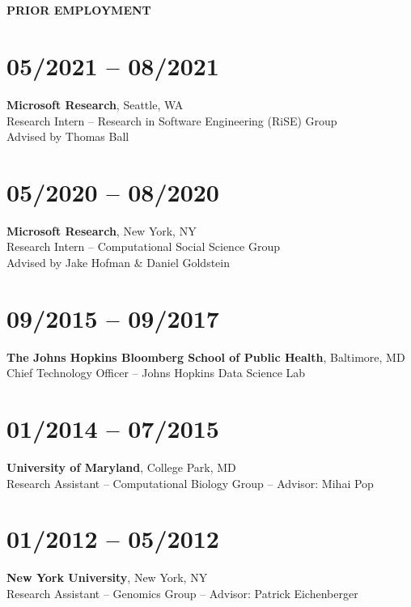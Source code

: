 \section{} \vspace{0.1in} \textbf{PRIOR EMPLOYMENT} \vspace{-0.5em}

\section{05/2021 -- 08/2021}
\textbf{Microsoft Research}, Seattle, WA \\
Research Intern -- Research in Software Engineering (RiSE) Group \\
Advised by Thomas Ball

\section{05/2020 -- 08/2020}
\textbf{Microsoft Research}, New York, NY \\
Research Intern -- Computational Social Science Group \\
Advised by Jake Hofman \& Daniel Goldstein

\section{09/2015 -- 09/2017}
\textbf{The Johns Hopkins Bloomberg School of Public Health}, Baltimore, MD \\
Chief Technology Officer -- Johns Hopkins Data Science Lab

\section{01/2014 -- 07/2015}
\textbf{University of Maryland}, College Park, MD \\
Research Assistant --  Computational Biology Group -- Advisor: Mihai Pop

\section{01/2012 -- 05/2012}
\textbf{New York University}, New York, NY \\
Research Assistant --  Genomics Group -- Advisor: Patrick Eichenberger

%
%
%


